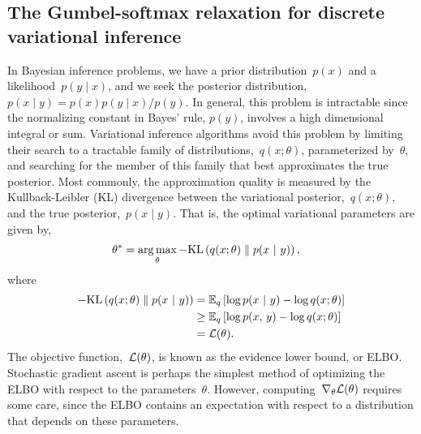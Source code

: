 \documentclass{article}
\begin{document}
\subsection{The Gumbel-softmax relaxation for discrete variational inference}
\label{sub:gumbel}

In Bayesian inference problems, we have a prior distribution~$p(x)$
and a likelihood~$p(y \mid x)$, and
we seek the posterior distribution,~${p(x \mid y) = p(x) p(y \mid x) / p(y)}$.
In general, this problem is intractable since the normalizing constant
in Bayes' rule, $p(y)$, involves a high dimensional integral or sum.
Variational inference algorithms avoid this problem by limiting their
search to a tractable family of distributions,~$q(x; \theta)$,
parameterized by~$\theta$, and searching for the member of this family
that best approximates the true posterior. Most commonly, the
approximation quality is measured by the Kullback-Leibler (KL)
divergence between the variational posterior,~$q(x; \theta)$, and the
true posterior,~$p(x \mid y)$. That is, the optimal variational
parameters are given by,
\begin{align}
  \theta^* &= \operatorname*{arg\,max}_\theta -\textrm{KL}\left(q(x; \theta)\;\|\;p(x ~\vert~ y)\right),
\end{align}
where
\begin{align}
  -\textrm{KL}\left(q(x; \theta)\;\|\;p(x ~\vert~ y)\right) 
  &= \mathbb{E}_{q}
  \left[ \log p(x ~\vert~ y) - \log q(x; \theta) \right] \\
  &\geq \mathbb{E}_{q}
  \left[ \log p(x, \, y) - \log q(x; \theta) \right] \\
  &= \mathcal{L}(\theta).
\end{align}
The objective function,~$\mathcal{L}(\theta)$, is known as the evidence lower bound, or ELBO.
Stochastic gradient ascent is
perhaps the simplest method of optimizing the ELBO with respect to
the parameters~$\theta$.
However, computing~$\nabla_\theta \mathcal{L}(\theta)$ requires some care,
since the ELBO contains an expectation with respect to a distribution
that depends on these parameters.
\end{document}
